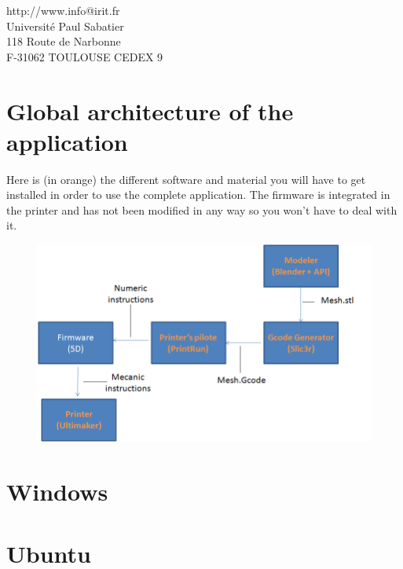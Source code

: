 \documentclass{article}
\begin{document}
\begin{center}
http://www.info@irit.fr\\
Université Paul Sabatier \\
118 Route de Narbonne \\
F-31062 TOULOUSE CEDEX 9
\end{center}

\thispagestyle{empty}

\newpage

\tableofcontents

\newpage

\section{Global architecture of the application}

Here is (in orange) the different software and material you will have to get installed in order to use the complete application. The firmware is integrated in the printer and has not been modified in any way so you won't have to deal with it.

\begin{figure}[!h]
\begin{center}
	\includegraphics[scale=0.4]{ARD1}
\end{center}
\end{figure}

\newpage

\section{Windows}

\newpage

\section{Ubuntu}
\end{document}
